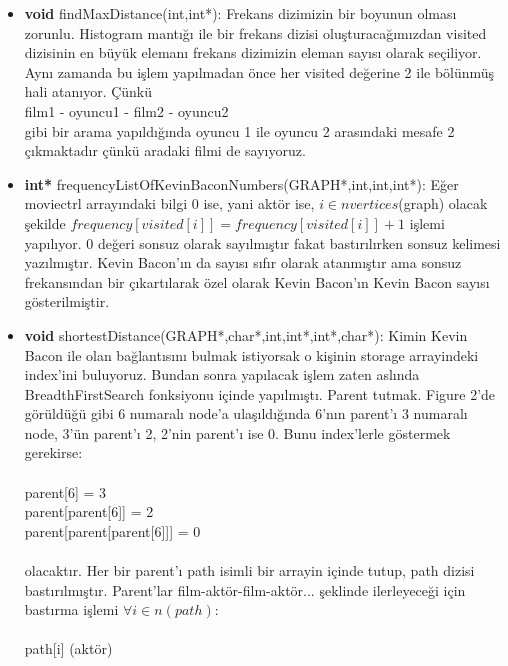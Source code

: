 \documentclass[11pt]{article}
\begin{document}
\begin{itemize}
	\item \textbf{void} \textsf{findMaxDistance(int,int*):} Frekans dizimizin bir boyunun olması zorunlu. Histogram mantığı ile bir frekans dizisi oluşturacağımızdan visited dizisinin en büyük elemanı frekans dizimizin eleman sayısı olarak seçiliyor. Aynı zamanda bu işlem yapılmadan önce her visited değerine 2 ile bölünmüş hali atanıyor. Çünkü \\
	\hspace*{3cm}film1 - oyuncu1 - film2 - oyuncu2\\
gibi bir arama yapıldığında oyuncu 1 ile oyuncu 2 arasındaki mesafe 2 çıkmaktadır çünkü aradaki filmi de sayıyoruz.
	\item \textbf{int*} \textsf{frequencyListOfKevinBaconNumbers(GRAPH*,int,int,int*):} Eğer moviectrl arrayındaki bilgi 0 ise, yani aktör ise, $ i \in nvertices$(graph) olacak şekilde $frequency[visited[i]] = frequency[visited[i]] + 1$ işlemi yapılıyor. 0 değeri sonsuz olarak sayılmıştır fakat bastırılırken sonsuz kelimesi yazılmıştır. Kevin Bacon'ın da sayısı sıfır olarak atanmıştır ama sonsuz frekansından bir çıkartılarak özel olarak Kevin Bacon'ın Kevin Bacon sayısı gösterilmiştir.
	\item \textbf{void} \textsf{shortestDistance(GRAPH*,char*,int,int*,int*,char*):} Kimin Kevin Bacon ile olan bağlantısını bulmak istiyorsak o kişinin \textsf{storage} arrayindeki index'ini buluyoruz. Bundan sonra yapılacak işlem zaten aslında \textsf{BreadthFirstSearch} fonksiyonu içinde yapılmıştı. Parent tutmak. Figure 2'de görüldüğü gibi 6 numaralı node'a ulaşıldığında 6'nın parent'ı 3 numaralı node, 3'ün parent'ı 2, 2'nin parent'ı ise 0. Bunu index'lerle göstermek gerekirse:\\ \\
	\hspace*{2cm}parent[6] = 3\\
	\hspace*{2cm}parent[parent[6]] = 2\\
	\hspace*{2cm}parent[parent[parent[6]]] = 0\\\\
olacaktır. Her bir parent'ı \textsf{path} isimli bir arrayin içinde tutup, path dizisi bastırılmıştır. Parent'lar film-aktör-film-aktör... şeklinde ilerleyeceği için bastırma işlemi $\forall i \in n(path)$:\\\\
	\hspace*{2cm} path[i] (aktör)\\

\end{itemize}
\end{document}
